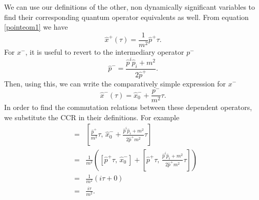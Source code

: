 \documentclass[a4paper,12pt]{article}
\numberwithin{equation}{section}
\begin{document}
We can use our definitions of the other, non dynamically significant variables to find their corresponding quantum operator equivalents as well. From equation \ref{pointeom1} we have
\begin{equation}\label{xplusheis}
\hat{x}^+(\tau) = \frac{1}{m^2}\hat{p}^+\tau.
\end{equation}
For $x^-$, it is useful to revert to the intermediary operator $p^-$
\begin{equation}
\hat{p}^- = \frac{\hat{p}^i\hat{p}_i + m^2}{2\hat{p}^+}.
\end{equation}
Then, using this, we can write the comparatively simple expression for $x^-$
\begin{equation}
\hat{x}^-(\tau) = \hat{x}_0^- + \frac{p^-}{m^2}\tau. 
\end{equation}
In order to find the commutation relations between these dependent operators, we substitute the CCR in their definitions. For example
\begin{eqnarray*}
[\hat{x}^+(\tau),\,\hat{x}^-(\tau)] &=& \left[\frac{\hat{p}^+}{m^2}\tau,\, \hat{x}_0^- + \frac{\hat{p}^i\hat{p}_i+m^2}{2\hat{p}^+m^2}\tau\right]\\
&=& \frac{1}{m^2}\left([\hat{p}^+\tau,\,\hat{x}^-_0] + \left[\hat{p}^+\tau,\, \frac{\hat{p}^i\hat{p}_i+m^2}{2\hat{p}^+m^2}\tau\right]\right)\\
&=& \frac{1}{m^2}\left(i\tau + 0\right)\\
&=& \frac{i\tau}{m^2}.
\end{eqnarray*} 
\end{document}
